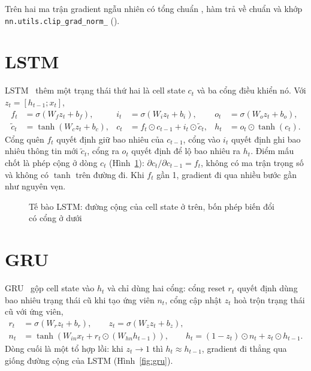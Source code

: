 Trên hai ma trận gradient ngẫu nhiên có tổng chuẩn , hàm trả về chuẩn
 và khớp \texttt{nn.utils.clip\_grad\_norm\_} ().

\section{LSTM}

LSTM~\cite{hochreiter1997} thêm một trạng thái thứ hai là cell state $c_t$ và ba cổng điều khiển nó. Với
$z_t = [h_{t-1}; x_t]$,
\begin{align}
  f_t &= \sigma(W_f z_t + b_f), & i_t &= \sigma(W_i z_t + b_i), & o_t &= \sigma(W_o z_t + b_o), \nonumber\\
  \tilde c_t &= \tanh(W_c z_t + b_c), & c_t &= f_t \odot c_{t-1} + i_t \odot \tilde c_t, & h_t &= o_t \odot \tanh(c_t).
  \label{eq:lstm}
\end{align}
Cổng quên $f_t$ quyết định giữ bao nhiêu của $c_{t-1}$, cổng vào $i_t$ quyết định ghi bao nhiêu thông tin mới
$\tilde c_t$, cổng ra $o_t$ quyết định để lộ bao nhiêu ra $h_t$. Điểm mấu chốt là phép cộng ở dòng $c_t$
(Hình~\ref{fig:lstm}): $\partial c_t / \partial c_{t-1} = f_t$, không có ma trận trọng số và không có $\tanh$ trên
đường đi. Khi $f_t$ gần 1, gradient đi qua nhiều bước gần như nguyên vẹn.

\begin{figure}[H]
  \centering
  \caption{Tế bào LSTM: đường cộng của cell state ở trên, bốn phép biến đổi có cổng ở dưới}
  \label{fig:lstm}
\end{figure}


\section{GRU}

GRU~\cite{cho2014} gộp cell state vào $h_t$ và chỉ dùng hai cổng: cổng reset $r_t$ quyết định dùng bao nhiêu trạng thái
cũ khi tạo ứng viên $n_t$, cổng cập nhật $z_t$ hoà trộn trạng thái cũ với ứng viên,
\begin{align}
  r_t &= \sigma(W_r z_t + b_r), \qquad z_t = \sigma(W_z z_t + b_z), \nonumber\\
  n_t &= \tanh\!\left(W_{in} x_t + r_t \odot (W_{hn} h_{t-1})\right), \qquad
  h_t = (1 - z_t) \odot n_t + z_t \odot h_{t-1}.
  \label{eq:gru}
\end{align}
Dòng cuối là một tổ hợp lồi: khi $z_t \to 1$ thì $h_t \approx h_{t-1}$, gradient đi thẳng qua giống đường cộng của
LSTM (Hình~\ref{fig:gru}).

